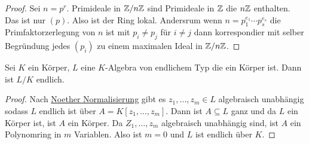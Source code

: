 \begin{proof}
    Sei $n=p^r$. Primideale in $\mathbb{Z}/n\mathbb{Z}$ sind Primideale in $\mathbb{Z}$ die $n\mathbb{Z}$ enthalten. Das ist nur $(p)$. Also ist der Ring lokal.
    Andersrum wenn $n=p_1^{e_1}\cdots p_s^{e_s}$ die Primfaktorzerlegung von $n$ ist mit $p_i\neq p_j$ für $i\neq j$ dann korrespondier mit selber Begründung jedes $(p_i)$ zu einem maximalen Ideal in $\mathbb{Z}/n\mathbb{Z}$.
\end{proof}
\begin{Satz}\label{Satz:WeakNst}
Sei $K$ ein Körper, $L$ eine $K$-Algebra von endlichem Typ die ein Körper ist.
Dann ist $L/K$ endlich.
    
\end{Satz}
\begin{proof}
    Nach \hyperref[Satz:NoetherNor]{Noether Normalisierung} gibt es $z_1,\dots,z_m\in L$ algebraisch unabhängig sodass $L$ endlich ist über $A=K[z_1,\dots,z_m]$.
    Dann ist $A\subseteq L$ ganz und da $L$ ein Körper ist, ist $A$ ein Körper.
    Da $Z_1,\dots,z_m$ algebraisch unabhängig sind, ist $A$ ein Polynomring in $m$ Variablen. Also ist $m=0$ und $L$ ist endlich über $K$.
\end{proof}
